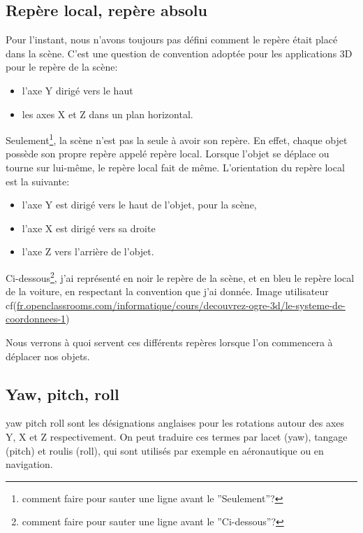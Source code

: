 \documentclass[10pt,a4paper]{report}
\begin{document}
\subsection{Rep\`ere local, rep\`ere absolu}

Pour l'instant, nous n'avons toujours pas d\'efini comment le rep\`ere \'etait plac\'e dans la sc\`ene. C'est une question de convention adopt\'ee pour les applications 3D	pour le rep\`ere de la sc\`ene:
\begin{itemize}
\item l'axe Y dirig\'e vers le haut 
\item les axes X et Z dans un plan horizontal.
\end{itemize}

Seulement\footnote{comment faire pour sauter une ligne avant le ''Seulement''?}, la sc\`ene n'est pas la seule \`{a} avoir son rep\`ere. En effet, chaque objet poss\`ede son propre rep\`ere appel\'e rep\`ere local. Lorsque l'objet se d\'eplace ou tourne sur lui-m\^eme, le rep\`ere local fait de m\^eme. L'orientation du rep\`ere local est la suivante: 
\begin{itemize}
\item l'axe Y est dirig\'e vers le haut de l'objet, pour la sc\`ene, 
\item l'axe X est dirig\'e vers sa droite
\item l'axe Z vers l'arri\`ere de l'objet.
\end{itemize}
	


Ci-dessous\footnote{comment faire pour sauter une ligne avant le ''Ci-dessous''?}, j'ai repr\'esent\'e en noir le rep\`ere de la sc\`ene, et en bleu le rep\`ere local de la voiture, en respectant la convention que j'ai donn\'ee.
Image utilisateur cf(\url{fr.openclassrooms.com/informatique/cours/decouvrez-ogre-3d/le-systeme-de-coordonnees-1})

Nous verrons \`{a} quoi servent ces diff\'erents rep\`eres lorsque l'on commencera \`{a} d\'eplacer nos objets.








\subsection{Yaw, pitch, roll}

yaw pitch roll sont les d\'esignations anglaises pour les rotations autour des axes Y, X et Z respectivement. On peut traduire ces termes par lacet (yaw), tangage (pitch) et roulis (roll), qui sont utilis\'es par exemple en a\'eronautique ou en navigation.
\end{document}
